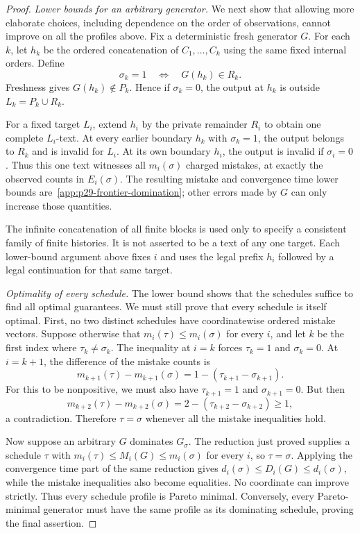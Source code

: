 \begin{proof}
\emph{Lower bounds for an arbitrary generator.}
We next show that allowing more elaborate choices, including dependence
on the order of observations, cannot improve on all the profiles above.
Fix a deterministic fresh generator $G$. For each $k$, let $h_k$
be the ordered concatenation of $C_1,\ldots,C_k$ using the same
fixed internal orders. Define
\[
 \sigma_k=1\quad\Longleftrightarrow\quad G(h_k)\in R_k.
\]
Freshness gives $G(h_k)\notin P_k$. Hence if $\sigma_k=0$,
the output at $h_k$ is outside $L_k=P_k\cup R_k$.

For a fixed target $L_i$, extend $h_i$ by the private remainder
$R_i$ to obtain one complete $L_i$-text. At every earlier boundary
$h_k$ with $\sigma_k=1$, the output belongs to $R_k$ and is
invalid for $L_i$. At its own boundary $h_i$, the output is invalid
if $\sigma_i=0$. Thus this one text witnesses all
$m_i(\sigma)$ charged mistakes, at exactly the observed counts
in $E_i(\sigma)$. The resulting mistake and convergence time lower bounds
are~\eqref{app:p29-frontier-domination}; other errors made by $G$
can only increase those quantities.

The infinite concatenation of all finite blocks is used only to
specify a consistent family of finite histories. It is not asserted
to be a text of any one target. Each lower-bound argument above
fixes $i$ and uses the legal prefix $h_i$ followed by a legal
continuation for that same target.

\emph{Optimality of every schedule.}
The lower bound shows that the schedules suffice to find all optimal
guarantees. We must still prove that every schedule is itself optimal.
First, no two distinct schedules have coordinatewise ordered
mistake vectors. Suppose otherwise that
$m_i(\tau)\le m_i(\sigma)$ for every $i$, and let $k$ be the
first index where $\tau_k\ne\sigma_k$. The inequality at $i=k$
forces $\tau_k=1$ and $\sigma_k=0$. At $i=k+1$, the difference
of the mistake counts is
\[
 m_{k+1}(\tau)-m_{k+1}(\sigma)
 =1-(\tau_{k+1}-\sigma_{k+1}).
\]
For this to be nonpositive, we must also have
$\tau_{k+1}=1$ and $\sigma_{k+1}=0$. But then
\[
 m_{k+2}(\tau)-m_{k+2}(\sigma)
 =2-(\tau_{k+2}-\sigma_{k+2})\ge1,
\]
a contradiction. Therefore $\tau=\sigma$ whenever all the
mistake inequalities hold.

Now suppose an arbitrary $G$ dominates $G_\sigma$. The reduction
just proved supplies a schedule $\tau$ with
$m_i(\tau)\le M_i(G)\le m_i(\sigma)$ for every $i$, so
$\tau=\sigma$. Applying the convergence time part of the same reduction
gives $d_i(\sigma)\le D_i(G)\le d_i(\sigma)$, while the mistake
inequalities also become equalities. No coordinate can improve
strictly. Thus every schedule profile is Pareto minimal. Conversely,
every Pareto-minimal generator must have the same profile as its
dominating schedule, proving the final assertion.
\end{proof}

